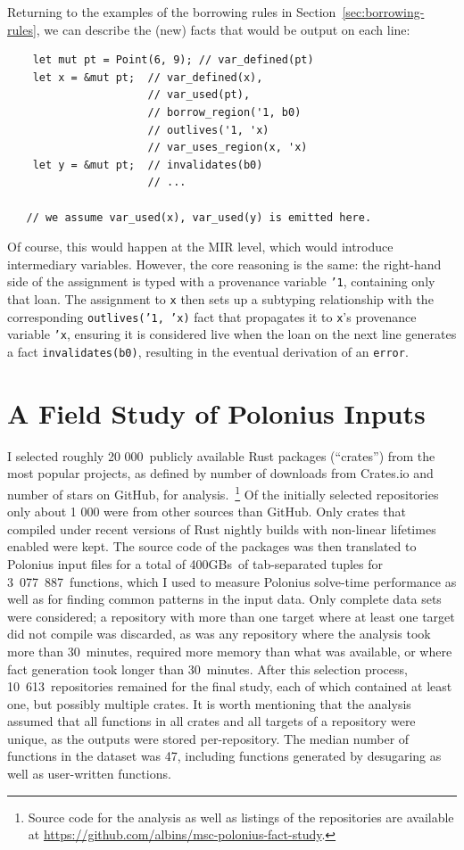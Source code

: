 \documentclass[11pt,a4paper,twoside,openany]{report}
\newcommand{\InRust}[1]{\texttt{#1}}
\newcommand{\InDatalog}[1]{\texttt{#1}}
\begin{document}
Returning to the examples of the borrowing rules in
Section~\ref{sec:borrowing-rules}, we can describe the (new) facts that would be
output on each line:
\begin{verbatim}
    let mut pt = Point(6, 9); // var_defined(pt)
    let x = &mut pt;  // var_defined(x),
                      // var_used(pt),
                      // borrow_region('1, b0)
                      // outlives('1, 'x)
                      // var_uses_region(x, 'x)
    let y = &mut pt;  // invalidates(b0)
                      // ...

   // we assume var_used(x), var_used(y) is emitted here.
\end{verbatim}

Of course, this would happen at the MIR level, which would introduce
intermediary variables. However, the core reasoning is the same: the right-hand
side of the assignment is typed with a provenance variable \InRust{'1},
containing only that loan. The assignment to \InRust{x} then sets up a subtyping
relationship with the corresponding \InDatalog{outlives('1, 'x)} fact that
propagates it to \InRust{x}'s provenance variable \InRust{'x}, ensuring it is
considered live when the loan on the next line generates a fact
\InRust{invalidates(b0)}, resulting in the eventual derivation of an
\InRust{error}.

\section{A Field Study of Polonius Inputs}\label{sec:field-study-borrow}

I selected roughly 20 000~publicly available Rust packages (``crates'') from the
most popular projects, as defined by number of downloads from Crates.io and
number of stars on GitHub, for analysis.~\footnote{Source code for the analysis
  as well as listings of the repositories are available at
  \url{https://github.com/albins/msc-polonius-fact-study}.} Of the initially
selected repositories only about 1 000 were from other sources than GitHub. Only
crates that compiled under recent versions of Rust nightly builds with
non-linear lifetimes enabled were kept. The source code of the packages was then
translated to Polonius input files for a total of 400GBs~of tab-separated tuples
for 3~077~887~functions, which I used to measure Polonius solve-time performance
as well as for finding common patterns in the input data. Only complete data
sets were considered; a repository with more than one target where at least one
target did not compile was discarded, as was any repository where the analysis
took more than 30~minutes, required more memory than what was available, or
where fact generation took longer than $30$~minutes. After this selection
process, 10~613~repositories remained for the final study, each of which
contained at least one, but possibly multiple crates. It is worth mentioning
that the analysis assumed that all functions in all crates and all targets of a
repository were unique, as the outputs were stored per-repository. The median
number of functions in the dataset was 47, including functions generated by
desugaring as well as user-written functions.
\end{document}
